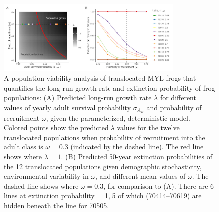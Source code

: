 \documentclass[9pt,twocolumn,twoside,lineno]{pnas-new}
\begin{document}
\begin{figure}

{\centering \includegraphics[width=0.8\textwidth]{figures/pop_viability_figures_for_manuscript1.jpg}

}

\caption{\label{fig-viability}A population viability analysis of
translocated MYL frogs that quantifies the long-run growth rate and
extinction probability of frog populations: (A) Predicted long-run
growth rate \(\lambda\) for different values of yearly adult survival
probability \(\sigma_{A_R}\) and probability of recruitment \(\omega\),
given the parameterized, deterministic model. Colored points show the
predicted \(\lambda\) values for the twelve translocated populations
when probability of recruitment into the adult class is \(\omega = 0.3\)
(indicated by the dashed line). The red line shows where
\(\lambda = 1\). (B) Predicted 50-year extinction probabilities of the
12 translocated populations given demographic stochasticity,
environmental variability in \(\omega\), and different mean values of
\(\omega\). The dashed line shows where \(\omega = 0.3\), for comparison
to (A). There are 6 lines at extinction probability = 1, 5 of which
(70414--70619) are hidden beneath the line for 70505.}

\end{figure}

\newpage
\end{document}
